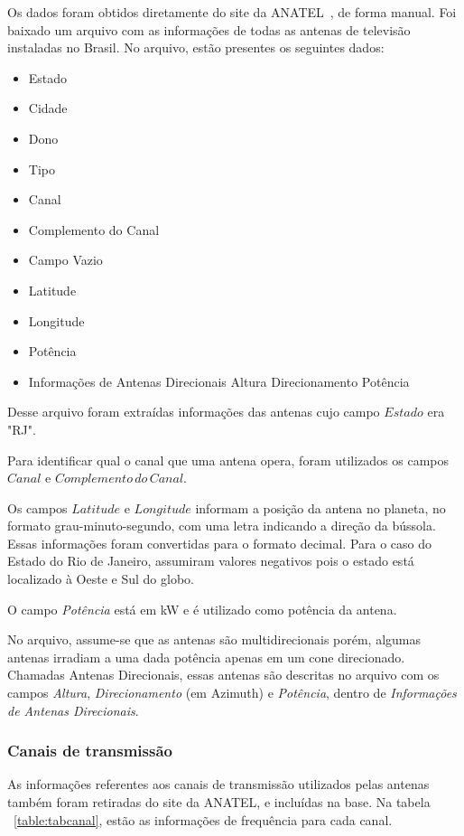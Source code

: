 Os dados foram obtidos diretamente do site da ANATEL~\cite{channelstable}, de forma manual. Foi baixado um arquivo com as informações de todas as antenas de televisão instaladas no Brasil. No arquivo, estão presentes os seguintes dados:

\begin{itemize}
\item Estado
\item Cidade
\item Dono
\item Tipo
\item Canal
\item Complemento do Canal 
\item Campo Vazio
\item Latitude 
\item Longitude 
\item Potência
\item Informações de Antenas Direcionais
	\subitem Altura
	\subitem Direcionamento
	\subitem Potência
\end{itemize}

Desse arquivo foram extraídas informações das antenas cujo campo $Estado$ era "RJ".

Para identificar qual o canal que uma antena opera, foram utilizados os campos $Canal$ e $Complemento\, do\, Canal$.

Os campos $Latitude$ e $Longitude$ informam a posição da antena no planeta, no formato grau-minuto-segundo, com uma letra indicando a direção da bússola. Essas informações foram convertidas para o formato decimal. Para o caso do Estado do Rio de Janeiro, assumiram valores negativos pois o estado está localizado à Oeste e Sul do globo.

O campo \textit{Potência} está em kW e é utilizado como potência da antena.

No arquivo, assume-se que as antenas são multidirecionais porém, algumas antenas irradiam a uma dada potência apenas em um cone direcionado. Chamadas Antenas Direcionais, essas antenas são descritas no arquivo com os campos \textit{Altura}, \textit{Direcionamento} (em Azimuth) e \textit{Potência}, dentro de \textit{Informações de Antenas Direcionais}.

\subsubsection{Canais de transmissão}

As informações referentes aos canais de transmissão utilizados pelas antenas também foram retiradas do site da ANATEL, e incluídas na base. Na tabela ~\ref{table:tabcanal}, estão as informações de frequência para cada canal.

